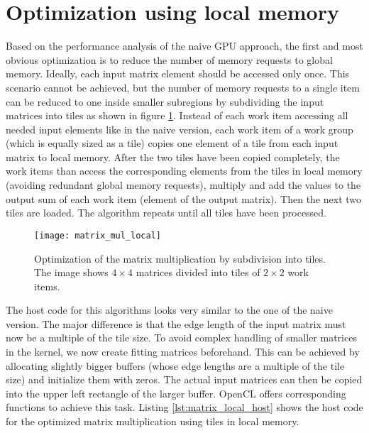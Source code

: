\section{Optimization using local memory}
\label{sec:matrix_mul_local}
Based on the performance analysis of the naive GPU approach, the first and most obvious optimization is to reduce the number of memory requests to global memory. Ideally, each input matrix element should be accessed only once. This scenario cannot be achieved, but the number of memory requests to a single item can be reduced to one inside smaller subregions by subdividing the input matrices into tiles as shown in figure \ref{fig:matrix_mul_local}. Instead of each work item accessing all needed input elements like in the naive version, each work item of a work group (which is equally sized as a tile) copies one element of a tile from each input matrix to local memory. After the two tiles have been copied completely, the work items than access the corresponding elements from the tiles in local memory (avoiding redundant global memory requests), multiply and add the values to the output sum of each work item (element of the output matrix). Then the next two tiles are loaded. The algorithm repeats until all tiles have been processed.

\begin{figure}
\centering
\texttt{[image: matrix\_mul\_local]}
\caption{Optimization of the matrix multiplication by subdivision into tiles. The image shows $4 \times 4$ matrices divided into tiles of $2 \times 2$ work items.}
\label{fig:matrix_mul_local}
\end{figure}

The host code for this algorithms looks very similar to the one of the naive version. The major difference is that the edge length of the input matrix must now be a multiple of the tile size. To avoid complex handling of smaller matrices in the kernel, we now create fitting matrices beforehand. This can be achieved by allocating slightly bigger buffers (whose edge lengths are a multiple of the tile size) and initialize them with zeros. The actual input matrices can then be copied into the upper left rectangle of the larger buffer. OpenCL offers corresponding functions to achieve this task. Listing \ref{lst:matrix_local_host} shows the host code for the optimized matrix multiplication using tiles in local memory.



